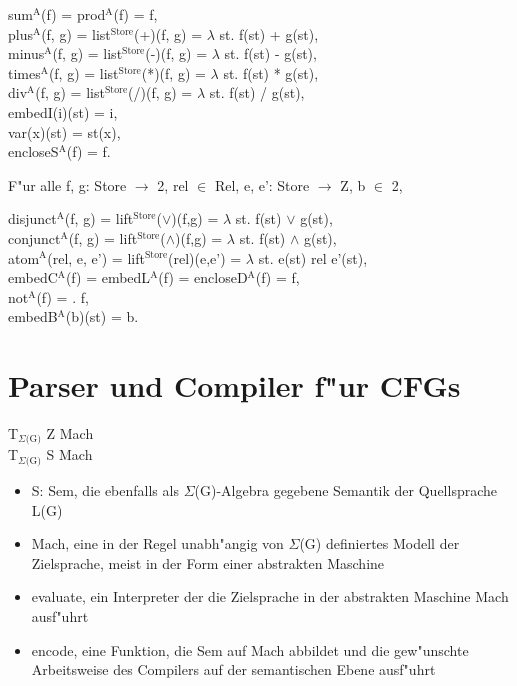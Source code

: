 \documentclass[11pt]{article}
\begin{document}
\begin{center}
sum$^{\text{A}}$(f) = prod$^{\text{A}}$(f) = f, \\
plus$^{\text{A}}$(f, g) = list$^{\text{Store}}$(+)(f, g) = $\lambda$ st. f(st) + g(st), \\
minus$^{\text{A}}$(f, g) = list$^{\text{Store}}$(-)(f, g) = $\lambda$ st. f(st) - g(st), \\
times$^{\text{A}}$(f, g) = list$^{\text{Store}}$(*)(f, g) = $\lambda$ st. f(st) * g(st), \\
div$^{\text{A}}$(f, g) = list$^{\text{Store}}$(/)(f, g) = $\lambda$ st. f(st) / g(st), \\
embedI(i)(st) = i, \\
var(x)(st) = st(x), \\
encloseS$^{\text{A}}$(f) = f.
\end{center}

F"ur alle f, g: Store $\to$ 2, rel $\in$ Rel, e, e': Store $\to$ Z, b $\in$ 2,

\begin{center}
disjunct$^{\text{A}}$(f, g) = lift$^{\text{Store}}$($\lor$)(f,g) = $\lambda$ st. f(st) $\lor$ g(st), \\
conjunct$^{\text{A}}$(f, g) = lift$^{\text{Store}}$($\land$)(f,g) = $\lambda$ st. f(st) $\land$ g(st), \\
atom$^{\text{A}}$(rel, e, e') = lift$^{\text{Store}}$(rel)(e,e') = $\lambda$ st. e(st) rel e'(st), \\
embedC$^{\text{A}}$(f) = embedL$^{\text{A}}$(f) = encloseD$^{\text{A}}$(f) = f, \\
not$^{\text{A}}$(f) = \textlnot{} . f, \\
embedB$^{\text{A}}$(b)(st) = b.
\end{center}

\section{Parser und Compiler f"ur CFGs}
\label{sec-5}

\label{diagram_1}
T$_{\Sigma\text{(G)}}$  Z  Mach \\
T$_{\Sigma\text{(G)}}$  S  Mach

\begin{itemize}
\item S: Sem, die ebenfalls als $\Sigma$(G)-Algebra gegebene Semantik der Quellsprache L(G)
\item Mach, eine in der Regel unabh"angig von $\Sigma$(G) definiertes Modell der Zielsprache, meist in der Form einer abstrakten Maschine
\item evaluate, ein Interpreter der die Zielsprache in der abstrakten Maschine Mach ausf"uhrt
\item encode, eine Funktion, die Sem auf Mach abbildet und die gew"unschte Arbeitsweise des Compilers auf der semantischen Ebene ausf"uhrt
\end{itemize}
\end{document}
